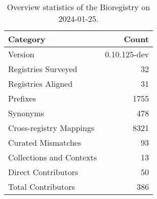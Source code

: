 \begin{table}
\caption{Overview statistics of the Bioregistry on 2024-01-25.}
\label{tab:bioregistry-summary}
\begin{tabular}{lr}
\toprule
Category & Count \\
\midrule
Version & 0.10.125-dev \\
Registries Surveyed & 32 \\
Registries Aligned & 31 \\
Prefixes & 1755 \\
Synonyms & 478 \\
Cross-registry Mappings & 8321 \\
Curated Mismatches & 93 \\
Collections and Contexts & 13 \\
Direct Contributors & 50 \\
Total Contributors & 386 \\
\bottomrule
\end{tabular}
\end{table}
